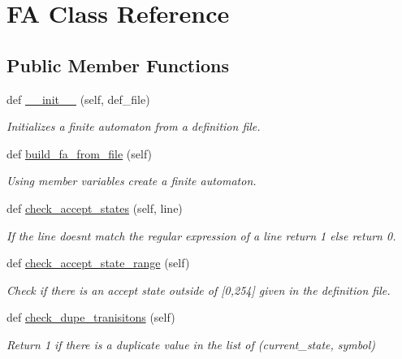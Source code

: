\hypertarget{classfinite__automaton_1_1_f_a}{}\section{FA Class Reference}
\label{classfinite__automaton_1_1_f_a}
\subsection*{Public Member Functions}
\begin{DoxyCompactItemize}
\item 
def \mbox{\hyperlink{classfinite__automaton_1_1_f_a_acc13390ea8996a5b9c95efec4ab3ac8c}{\+\_\+\+\_\+init\+\_\+\+\_\+}} (self, def\+\_\+file)
\begin{DoxyCompactList}\small\item\em Initializes a finite automaton from a definition file. \end{DoxyCompactList}\item 
def \mbox{\hyperlink{classfinite__automaton_1_1_f_a_a99687a41970ccfd859dacdf6ab41a0f1}{build\+\_\+fa\+\_\+from\+\_\+file}} (self)
\begin{DoxyCompactList}\small\item\em Using member variables create a finite automaton. \end{DoxyCompactList}\item 
def \mbox{\hyperlink{classfinite__automaton_1_1_f_a_afffebaa358fefaf2b7ad69787744874a}{check\+\_\+accept\+\_\+states}} (self, line)
\begin{DoxyCompactList}\small\item\em If the line doesn\textquotesingle{}t match the regular expression of a line return 1 else return 0. \end{DoxyCompactList}\item 
def \mbox{\hyperlink{classfinite__automaton_1_1_f_a_a3a87627d77810aed5976b4f053542b37}{check\+\_\+accept\+\_\+state\+\_\+range}} (self)
\begin{DoxyCompactList}\small\item\em Check if there is an accept state outside of \mbox{[}0,254\mbox{]} given in the definition file. \end{DoxyCompactList}\item 
def \mbox{\hyperlink{classfinite__automaton_1_1_f_a_ac6ce3b4cc7d71b74ce160e55062a0402}{check\+\_\+dupe\+\_\+tranisitons}} (self)
\begin{DoxyCompactList}\small\item\em Return 1 if there is a duplicate value in the list of (current\+\_\+state, symbol) \end{DoxyCompactList}\item 

\end{DoxyCompactItemize}
